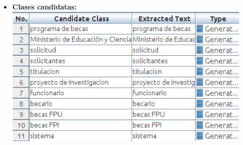 \documentclass{article}
\begin{document}
{\begin{flushleft}
\begin{itemize}
\item\textbf {Clases candidatas: }\\
\includegraphics[width=12cm]{img/CLASES} \hspace{0.5cm}


\end{itemize}
\end{flushleft}}
\end{document}
